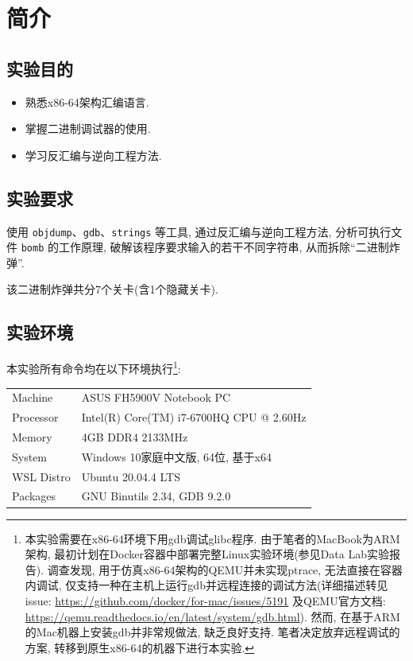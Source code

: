 
\section{简介}

\subsection{实验目的}

\begin{itemize}[noitemsep]
    \item 熟悉x86-64架构汇编语言.
    \item 掌握二进制调试器的使用.
    \item 学习反汇编与逆向工程方法.
\end{itemize}

\subsection{实验要求}

使用 \verb|objdump|、\verb|gdb|、\verb|strings| 等工具, 通过反汇编与逆向工程方法, 分析可执行文件 \verb|bomb| 的工作原理, 破解该程序要求输入的若干不同字符串, 从而拆除“二进制炸弹”. \par
该二进制炸弹共分7个关卡(含1个隐藏关卡).

\subsection{实验环境}

\def\envcontent{本实验需要在x86-64环境下用gdb调试glibc程序. 由于笔者的MacBook为ARM架构, 最初计划在Docker容器中部署完整Linux实验环境(参见Data Lab实验报告). 调查发现, 用于仿真x86-64架构的QEMU并未实现ptrace, 无法直接在容器内调试, 仅支持一种在主机上运行gdb并远程连接的调试方法(详细描述转见issue: \url{https://github.com/docker/for-mac/issues/5191} 及QEMU官方文档: \url{https://qemu.readthedocs.io/en/latest/system/gdb.html}). 然而, 在基于ARM的Mac机器上安装gdb并非常规做法, 缺乏良好支持. 笔者决定放弃远程调试的方案, 转移到原生x86-64的机器下进行本实验.}

本实验所有命令均在以下环境执行\footnote{\envcontent}:
\vspace{8pt}\par{\small\begin{tabular}{ll}
    Machine & ASUS FH5900V Notebook PC\\
    Processor & Intel(R) Core(TM) i7-6700HQ CPU @ 2.60Hz \\
    Memory & 4GB DDR4 2133MHz \\
    System & Windows 10家庭中文版, 64位, 基于x64 \\
    WSL Distro & Ubuntu 20.04.4 LTS \\
    Packages & GNU Binutils 2.34, GDB 9.2.0
\end{tabular}}

